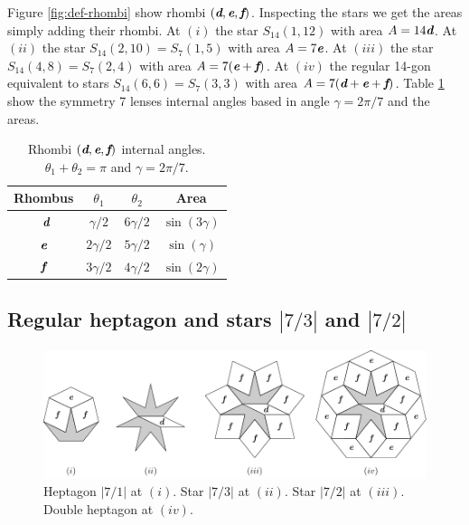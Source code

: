 \documentclass[11pt]{article}
\def\mathbi#1{\textbf{\em #1}}
\begin{document}
Figure \ref{fig:def-rhombi} show rhombi $(\mathbi{d},\mathbi{e},\mathbi{f})$. 
Inspecting the stars we get the areas simply adding their rhombi.
At $(i)$ the star $S_{14}(1,12)$ with area $A = 14\mathbi{d}$. 
At $(ii)$ the star $S_{14}(2,10) = S_7(1,5)$ with area $A = 7\mathbi{e}$.
At $(iii)$ the star $S_{14}(4,8) = S_7(2,4)$ with area $A = 7(\mathbi{e} + \mathbi{f})$.
At $(iv)$ the regular 14-gon equivalent to stars $S_{14}(6,6) = S_7(3,3)$ with area $A = 7(\mathbi{d} + \mathbi{e} + \mathbi{f})$.
Table \ref{tbl:def-angles} show the symmetry 7 lenses internal angles based in angle $\gamma = 2\pi/7$ and the areas.

\begin{table}[H]
\begin{center}
\begin{tabular}{|c|c c| c |} \hline
Rhombus & $\theta_1$ & $\theta_2$ & Area \\ \hline\
$\mathbi{d}$ & $\gamma/2$ & $6\gamma/2$ & $\sin(3\gamma)$
\\[0.5ex] \hline
$\mathbi{e}$ & $2\gamma/2$ & $5\gamma/2$ & $\sin(\gamma)$
\\[0.5ex] \hline
$\mathbi{f}$ & $3\gamma/2$ & $4\gamma/2$ & $\sin(2\gamma)$
\\[0.5ex] \hline
\end{tabular}
\caption{Rhombi $(\mathbi{d},\mathbi{e},\mathbi{f})$ internal angles. $\theta_1 + \theta_2 = \pi$ and $\gamma = 2\pi/7$.} 
\label{tbl:def-angles}
\end{center}
\end{table}



\subsection{Regular heptagon and stars $|7/3|$ and $|7/2|$}

\begin{figure}[H]
\centering
\includegraphics[scale=1.1]{def/hepta}
\caption{Heptagon $|7/1|$ at $(i)$. Star $|7/3|$ at $(ii)$. Star $|7/2|$ at $(iii)$. Double heptagon at $(iv)$.}
\label{fig:def-hepta}
\end{figure}
\end{document}
